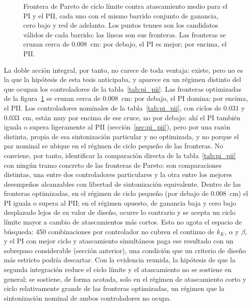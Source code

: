 \begin{figure}[ht]
    \centering
    
    \caption[Fronteras de Pareto, PI contra PII]{Frontera de Pareto de ciclo límite contra atascamiento medio para el PI y el PII, cada uno con el mismo barrido conjunto de ganancia, cero bajo y red de adelanto. Los puntos tenues son los candidatos válidos de cada barrido; las líneas son sus fronteras. Las fronteras se cruzan cerca de $0.008$~cm: por debajo, el PI es mejor; por encima, el PII.}
    \label{fig:fronteras}
\end{figure}

La doble acción integral, por tanto, no carece de toda ventaja: existe, pero no es la que la hipótesis de esta tesis anticipaba, y aparece en un régimen distinto del que ocupan los controladores de la tabla~\ref{tab:pi_pii}. Las fronteras optimizadas de la figura~\ref{fig:fronteras} se cruzan cerca de $0.008$~cm: por debajo, el PI domina; por encima, el PII. Los controladores nominales de la tabla~\ref{tab:pi_pii}, con ciclos de $0.031$ y $0.033$~cm, están muy por encima de ese cruce, no por debajo: ahí el PI también iguala o supera ligeramente al PII (sección~\ref{sec:pi_pii}), pero por una razón distinta, propia de esa sintonización particular y no optimizada, y no porque el par nominal se ubique en el régimen de ciclo pequeño de las fronteras. No conviene, por tanto, identificar la comparación directa de la tabla~\ref{tab:pi_pii} con ningún tramo concreto de las fronteras de Pareto: son comparaciones distintas, una entre dos controladores particulares y la otra entre los mejores desempeños alcanzables con libertad de sintonización equivalente. Dentro de las fronteras optimizadas, en el régimen de ciclo pequeño (por debajo de $0.008$~cm) el PI iguala o supera al PII; en el régimen opuesto, de ganancia baja y cero bajo desplazado lejos de su valor de diseño, ocurre lo contrario y se acepta un ciclo límite mayor a cambio de atascamientos más cortos. Esto no agota el espacio de búsqueda: 450 combinaciones por controlador no cubren el continuo de $k_K$, $\alpha$ y $\beta$, y el PI con mejor ciclo y atascamiento simultáneos paga ese resultado con un sobrepaso considerable (sección anterior), una condición que un criterio de diseño más estricto podría descartar. Con la evidencia reunida, la hipótesis de que la segunda integración reduce el ciclo límite y el atascamiento no se sostiene en general; se sostiene, de forma acotada, solo en el régimen de atascamiento corto y ciclo relativamente grande de las fronteras optimizadas, un régimen que la sintonización nominal de ambos controladores no ocupa.

